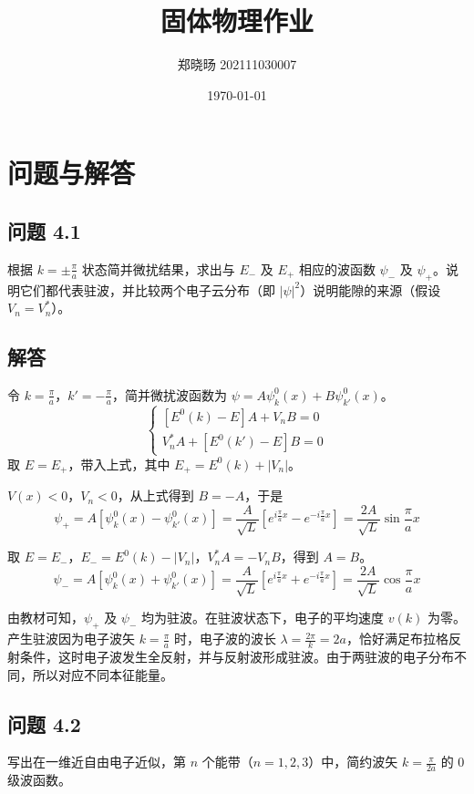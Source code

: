 \documentclass[12pt, a4paper]{article}
\title{固体物理作业}
\author{郑晓旸 202111030007} %
\date{\today} %
\begin{document}
\maketitle %

\section*{问题与解答} %
\subsection*{问题 4.1}
根据 \(k = \pm \frac{\pi}{a}\) 状态简并微扰结果，求出与 \(E_-\) 及 \(E_+\) 相应的波函数 \(\psi_-\) 及 \(\psi_+\)。说明它们都代表驻波，并比较两个电子云分布（即 \(|\psi|^2\)）说明能隙的来源（假设 \(V_n = V_n^*\)）。

\subsection*{解答}
令 \(k = \frac{\pi}{a}\)，\(k' = -\frac{\pi}{a}\)，简并微扰波函数为 \(\psi = A\psi_k^0(x) + B\psi_{k'}^0(x)\)。
\[
\begin{cases}
[E^0(k) - E]A + V_n B = 0 \\
V_n^* A + [E^0(k') - E]B = 0
\end{cases}
\]
取 \(E = E_+\)，带入上式，其中 \(E_+ = E^0(k) + |V_n|\)。

\(V(x) < 0\)，\(V_n < 0\)，从上式得到 \(B = -A\)，于是
\[
\psi_+ = A[\psi_k^0(x) - \psi_{k'}^0(x)] = \frac{A}{\sqrt{L}} \left[ e^{i\frac{\pi}{a}x} - e^{-i\frac{\pi}{a}x} \right] = \frac{2A}{\sqrt{L}} \sin \frac{\pi}{a} x
\]

取 \(E = E_-\)，\(E_- = E^0(k) - |V_n|\)，\(V_n^* A = -V_n B\)，得到 \(A = B\)。
\[
\psi_- = A[\psi_k^0(x) + \psi_{k'}^0(x)] = \frac{A}{\sqrt{L}} \left[ e^{i\frac{\pi}{a}x} + e^{-i\frac{\pi}{a}x} \right] = \frac{2A}{\sqrt{L}} \cos \frac{\pi}{a} x
\]

由教材可知，\(\psi_+\) 及 \(\psi_-\) 均为驻波。在驻波状态下，电子的平均速度 \(v(k)\) 为零。产生驻波因为电子波矢 \(k = \frac{\pi}{a}\) 时，电子波的波长 \(\lambda = \frac{2\pi}{k} = 2a\)，恰好满足布拉格反射条件，这时电子波发生全反射，并与反射波形成驻波。由于两驻波的电子分布不同，所以对应不同本征能量。

\subsection*{问题 4.2}
写出在一维近自由电子近似，第 \(n\) 个能带（\(n = 1, 2, 3\)）中，简约波矢 \(k = \frac{\pi}{2a}\) 的 0 级波函数。
\end{document}

